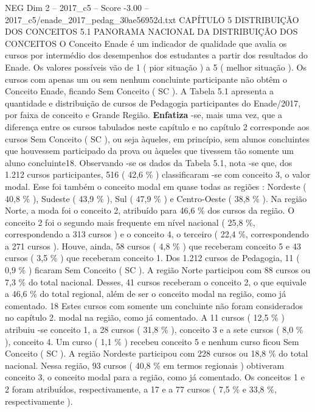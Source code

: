 \begin{textsample}{NEG Dim 2 – 2017\_c5 – Score -3.00 – 2017\_c5/enade\_2017\_pedag\_30ae56952d.txt}  \label{ex:f2_neg_044}
CAPÍTULO 5 DISTRIBUIÇÃO DOS CONCEITOS 5.1 PANORAMA NACIONAL DA DISTRIBUIÇÃO DOS CONCEITOS O Conceito Enade é um indicador de qualidade que avalia os cursos por intermédio dos desempenhos dos estudantes a partir dos resultados do Enade.
Os valores possíveis vão de 1 ( pior situação ) a 5 ( melhor situação ).
Os cursos com apenas um ou sem nenhum concluinte participante não obtêm o Conceito Enade, ficando Sem Conceito ( SC ).
A Tabela 5.1 apresenta a quantidade e distribuição de cursos de Pedagogia participantes do Enade/2017, por faixa de conceito e Grande Região. \textbf{Enfatiza} -se, mais uma vez, que a diferença entre os cursos tabulados neste capítulo e no capítulo 2 corresponde aos cursos Sem Conceito ( SC ), ou seja àqueles, em princípio, sem alunos concluintes que houvessem participado da prova ou àqueles que tivessem tão somente um aluno concluinte18.
Observando -se os dados da Tabela 5.1, nota -se que, dos 1.212 cursos participantes, 516 ( 42,6 \% ) classificaram -se com conceito 3, o valor modal.
Esse foi também o conceito modal em quase todas as regiões : Nordeste ( 40,8 \% ), Sudeste ( 43,9 \% ), Sul ( 47,9 \% ) e Centro-Oeste ( 38,8 \% ).
Na região Norte, a moda foi o conceito 2, atribuído para 46,6 \% dos cursos da região.
O conceito 2 foi o segundo mais frequente em nível nacional ( 25,8 \%, correspondendo a 313 cursos ) e o conceito 4, o terceiro ( 22,4 \%, correspondendo a 271 cursos ).
Houve, ainda, 58 cursos ( 4,8 \% ) que receberam conceito 5 e 43 cursos ( 3,5 \% ) que receberam conceito 1.
Dos 1.212 cursos de Pedagogia, 11 ( 0,9 \% ) ficaram Sem Conceito ( SC ).
A região Norte participou com 88 cursos ou 7,3 \% do total nacional.
Desses, 41 cursos receberam o conceito 2, o que equivale a 46,6 \% do total regional, além de ser o conceito modal na região, como já comentado. 18 Estes cursos com somente um concluinte não foram considerados no capítulo 2. modal na região, como já comentado.
A 11 cursos ( 12,5 \% ) atribuiu -se conceito 1, a 28 cursos ( 31,8 \% ), conceito 3 e a sete cursos ( 8,0 \% ), conceito 4.
Um curso ( 1,1 \% ) recebeu conceito 5 e nenhum curso ficou Sem Conceito ( SC ).
A região Nordeste participou com 228 cursos ou 18,8 \% do total nacional.
Nessa região, 93 cursos ( 40,8 \% em termos regionais ) obtiveram conceito 3, o conceito modal para a região, como já comentado.
Os conceitos 1 e 2 foram atribuídos, respectivamente, a 17 e a 77 cursos ( 7,5 \% e 33,8 \%, respectivamente ).

\end{textsample}

